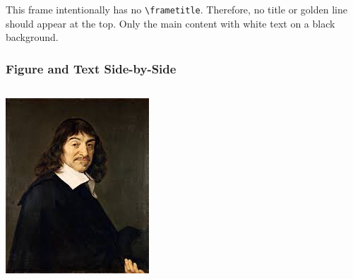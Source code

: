\documentclass[12pt]{beamer} %
\begin{document}
	
	\begin{frame}
		This frame intentionally has no \texttt{\textbackslash frametitle}.
		Therefore, no title or golden line should appear at the top.
		Only the main content with white text on a black background.
	\end{frame}
	
	\begin{frame}
		\frametitle{Figure and Text Side-by-Side} %
		
		\begin{columns}[T] %
			
			\begin{column}{0.50\textwidth} %
				\centering %
				\includegraphics[width=0.8\linewidth]{dikaer.jpg}
				
			\end{column}
			

\end{columns}
\end{frame}
\end{document}
